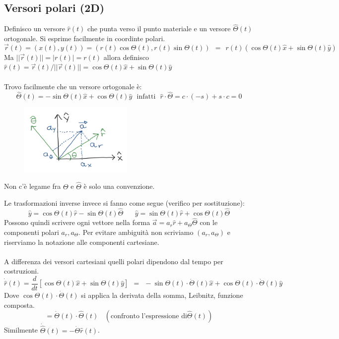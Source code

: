 \subsection{Versori polari (2D)}
Definisco un versore $\hat{r}(t)$ che punta verso il punto materiale e un versore $\hat{\Theta}(t)$ ortogonale.
Si esprime facilmente in coordinte polari.
$$\vec{r}(t) = (x(t), y(t)) = (r(t)\cos \Theta(t), r(t)\sin\Theta(t)) \:\: = \:\: r(t)(\cos\Theta(t)\hat{x} + \sin\Theta(t)\hat{y})$$
Ma $||\vec{r}(t)|| = |r(t)| = r(t)$ allora definisco $\hat{r}(t) = \vec{r}(t)/ ||\vec{r}(t)|| = \cos \Theta(t)\hat{x} + \sin\Theta(t)\hat{y}$\\\\
Trovo facilmente che un versore ortogonale è:
$$\hat{\Theta}(t) = -\sin\Theta(t)\hat{x} + \cos\Theta(t)\hat{y} \:\:\:\text{infatti} \:\:\: \hat{r}\cdot \hat{\Theta} = c \cdot (-s) + s \cdot c = 0$$
\begin{figure}
    \centering
    \includegraphics[width=5.5cm]{images/trasformazioni-inverse.png}
\end{figure}
\begin{note}
    Non c'è legame fra $\Theta$ e $\hat{\Theta}$ è solo una convenzione.
\end{note}
\hspace{-15pt}Le trasformazioni inverse invece si fanno come segue (verifico per sostituzione):
$$\hat{y} = \cos\Theta(t)\hat{r} - \sin\Theta(t)\hat{\Theta} \hspace{20pt} \hat{y} = \sin\Theta(t)\hat{r} + \cos\Theta(t)\hat{\Theta}$$
Possono quindi scrivere ogni vettore nella forma $\vec{a} = a_r\hat{r} + a_{\Theta}\hat{\Theta}$ con le componenti polari $a_r, a_{\Theta}$.
Per evitare ambiguità non scriviamo $(a_r, a_{\Theta})$ e riserviamo la notazione alle componenti cartesiane.\\\\
A differenza dei versori cartesiani quelli polari dipendono dal tempo per costruzioni.
$$\dot{\hat{r}}(t) = \frac{d}{dt}[\cos\Theta(t) \hat{x} + \sin\Theta(t)\hat{y}] \:\: = \:\: -\sin\Theta(t) \cdot \dot{\Theta}(t)\hat{x} + \cos\Theta(t) \cdot \dot{\Theta}(t)\hat{y}$$
Dove $\cos\Theta(t) \cdot \dot{\Theta}(t)$ si applica la derivata della somma, Leibnitz, funzione composta.
$$= \dot{\Theta}(t)\cdot \hat{\Theta}(t) \:\:\:\:(\text{confronto l'espressione di} \hat{\Theta}(t))$$
Similmente $\dot{\hat{\Theta}}(t)= - \dot{\Theta}\hat{r}(t)$.


